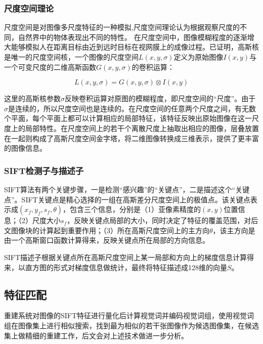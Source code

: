 \documentclass[UTF8]{csoarticle}
\begin{document}
\subsubsection{尺度空间理论}
尺度空间是对图像多尺度特征的一种模拟,尺度空间理论认为根据观察尺度的不同，自然界中的物体表现出不同的特性。
在尺度空间中，图像模糊程度的逐渐增大能够模拟人在距离目标由近到远时目标在视网膜上的成像过程。已证明，高斯核是唯一的尺度空间核，一个图像的尺度空间\(L(x,y,\sigma)\)定义为原始图像\(I(x,y)\)与一个可变尺度的二维高斯函数\(G(x,y,\sigma)\)的卷积运算：

\begin{equation}
  L(x,y,\sigma) = G(x,y,\sigma) \otimes I(x,y)
\end{equation}

这里的高斯核参数\(\sigma\)反映卷积运算对原图的模糊程度，即尺度空间的“尺度”。由于\(\sigma\)是连续的，所以尺度空间也是连续的。在尺度空间的任意两个尺度之间，有无数个平面，每个平面上都可以计算相应的局部特征，该特征反映出原始图像在这一尺度上的局部特性。在尺度空间上的若干个离散尺度上抽取出相应的图像，层叠放置在一起则构成了高斯尺度空间金字塔，将二维图像转换成三维表示，提供了更丰富的图像信息。

\subsubsection{SIFT检测子与描述子}
SIFT算法有两个关键步骤，一是检测“感兴趣”的“关键点”，二是描述这个“关键点”。SIFT关键点是精心选择的一组在高斯差分尺度空间上的极值点。该关键点表示成\((x_f,y_f,s_f,\theta)\)，包含三个信息，分别是（1）亚像素精度的\((x,y)\)位置信息；（2）尺度大小\(s_f\)，反映关键点局部的大小，同时决定了特征的覆盖范围，对后文图像块的计算起到重要作用；（3）所在高斯尺度空间上的主方向\(\theta\)，该主方向是由一个高斯窗口函数计算得来，反映关键点所在局部的方向信息。

SIFT描述子根据关键点所在高斯尺度空间上某一局部和方向上的梯度信息计算得来，以直方图的形式对梯度信息做统计，最终将特征描述成128维的向量\(S\)。

\subsection{特征匹配}
重建系统对图像的SIFT特征进行量化后计算视觉词并编码视觉词组，使用视觉词组在图像集上进行相似搜索，找到最为相似的若干张图像作为候选图像集，在候选集上做精细的重建工作，后文会对上述技术做进一步分析。
\end{document}
